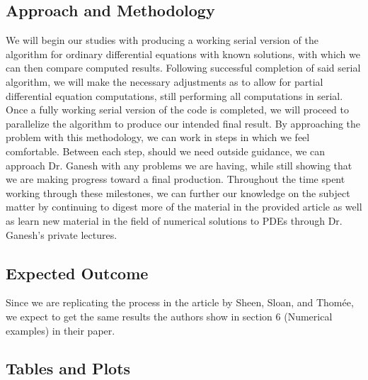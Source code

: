 \documentclass[letterpaper, 12pt]{article}
\begin{document}
	\subsection*{Approach and Methodology}
	\hspace{5mm} We will begin our studies with producing a working serial version of the algorithm for ordinary differential equations with known solutions, with which we can then compare computed results. Following successful completion of said serial algorithm, we will make the necessary adjustments as to allow for partial differential equation computations, still performing all computations in serial. Once a fully working serial version of the code is completed, we will proceed to parallelize the algorithm to produce our intended final result. By approaching the problem with this methodology, we can work in steps in which we feel comfortable. Between each step, should we need outside guidance, we can approach Dr. Ganesh with any problems we are having, while still showing that we are making progress toward a final production. Throughout the time spent working through these milestones, we can further our knowledge on the subject matter by continuing to digest more of the material in the provided article\cite{
sheen03} as well as learn new material in the field of numerical solutions to PDEs through Dr. Ganesh's private lectures.
	
	\subsection*{Expected Outcome}
	\hspace{5mm} Since we are replicating the process in the article by Sheen, Sloan, and Thom\'{e}e, we expect to get the same results the authors show in section 6 (Numerical examples) in their paper.\cite{sheen03}
	
	\subsection*{Tables and Plots}
	
\end{document}
